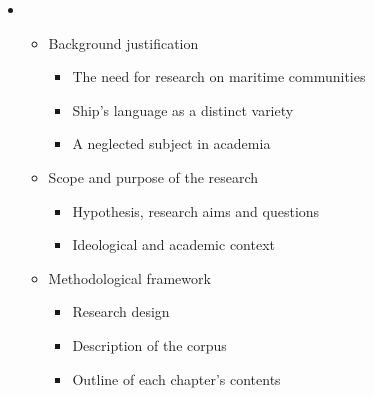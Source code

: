 \begin{itemize}
\item \begin{itemize}
\item \begin{styleNormali}
Background justification 
\end{styleNormali}

\begin{itemize}
\item \begin{styleNormali}
The need for research on maritime communities
\end{styleNormali}
\item \begin{styleNormali}
Ship’s language as a distinct variety
\end{styleNormali}
\item \begin{styleNormali}
A neglected subject in academia 
\end{styleNormali}
\end{itemize}
\item \begin{styleNormali}
Scope and purpose of the research  
\end{styleNormali}

\begin{itemize}
\item \begin{styleNormali}
Hypothesis, research aims and questions 
\end{styleNormali}
\item \begin{styleNormali}
Ideological and academic context
\end{styleNormali}
\end{itemize}
\item \begin{styleNormali}
Methodological framework 
\end{styleNormali}

\begin{itemize}
\item \begin{styleNormali}
Research design
\end{styleNormali}
\item \begin{styleNormali}
Description of the corpus
\end{styleNormali}
\item \begin{styleNormali}
Outline of each chapter’s contents
\end{styleNormali}
\end{itemize}
\end{itemize}
\end{itemize}

